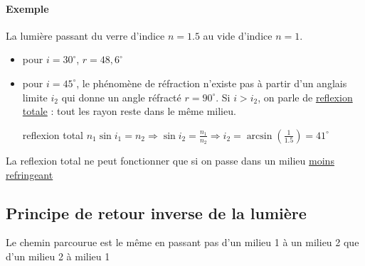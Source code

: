 \paragraph{Exemple} La lumière passant du verre d'indice $n=1.5$ au vide d'indice $n=1$. 
\begin{itemize}
	\item pour $i=30^\circ$, $r=48,6^\circ$
	\item pour $i=45^\circ$, le phénomène de réfraction n'existe pas à partir d'un anglais limite $i_2$ qui donne un angle réfracté $r=90^\circ$. Si $i > i_2$, on parle de \ul{reflexion totale} : tout les rayon reste dans le même milieu.

	\item[reflexion total] $n_1 \sin i_1 = n_2 \Rightarrow \sin i_2 = \frac{n_1}{n_2} \Rightarrow i_2 = \arcsin(\frac{1}{1.5}) = 41^\circ$
\end{itemize}

La reflexion total ne peut fonctionner que si on passe dans un milieu \ul{moins refringeant}

\subsection{Principe de retour inverse de la lumière}

Le chemin parcourue est le même en passant pas d'un milieu 1 à un milieu 2 que d'un milieu 2 à milieu 1
